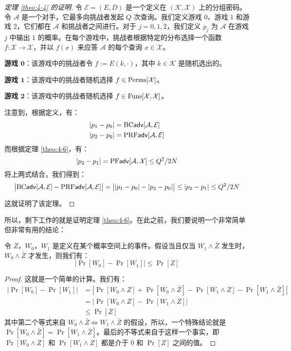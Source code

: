 \begin{proof}[定理 \ref{theo:4-4} 的证明]
令 $\mathcal{E}=(E,D)$ 是一个定义在 $(\mathcal{K},\mathcal{X})$ 上的分组密码。令 $\mathcal{A}$ 是一个对手，它最多向挑战者发起 $Q$ 次查询。我们定义游戏 $0$、游戏 $1$ 和游戏 $2$，它们都在 $\mathcal{A}$ 和挑战者之间进行。对于 $j=0,1,2$，我们定义 $p_j$ 为 $\mathcal{A}$ 在游戏 $j$ 中输出 $1$ 的概率。在每个游戏中，挑战者根据特定的分布选择一个函数 $f:\mathcal{X}\to\mathcal{X}$，并以 $f(x)$ 来应答 $\mathcal{A}$ 的每个查询 $x\in\mathcal{X}$。

\noindent\textbf{游戏 $\mathbf{0}$}：该游戏中的挑战者令 $f:=E(k,\cdot)$，其中 $k\in\mathcal{K}$ 是随机选出的。

\noindent\textbf{游戏 $\mathbf{1}$}：该游戏中的挑战者随机选择 $f\in{\rm Perms}[\mathcal{X}]$。

\noindent\textbf{游戏 $\mathbf{2}$}：该游戏中的挑战者随机选择 $f\in{\rm Funs}[\mathcal{X},\mathcal{X}]$。

注意到，根据定义，有：
\[
\begin{aligned}
	& |p_1-p_0| = {\rm BC\mathsf{adv}}[\mathcal{A},\mathcal{E}]\\
	& |p_2-p_0| = {\rm PRF\mathsf{adv}}[\mathcal{A},\mathcal{E}]
\end{aligned}
\]
而根据定理 \ref{theo:4-6}，有：
\[
|p_2-p_1|={\rm PF\mathsf{adv}}[\mathcal{A},\mathcal{X}]\leq{Q^2}/{2N}
\]
将上两式结合，我们得到：
\[
\big\lvert
{\rm BC\mathsf{adv}}[\mathcal{A},\mathcal{E}]-{\rm PRF\mathsf{adv}}[\mathcal{A},\mathcal{E}]
\big\rvert
=
\big\lvert
|p_1-p_0|-|p_2-p_0|
\big\rvert
\leq|p_2-p_1|\leq{Q^2}/{2N}
\]

这就证明了该定理。
\end{proof}

所以，剩下工作的就是证明定理 \ref{theo:4-6}。在此之前，我们要说明一个非常简单但非常有用的结论：

\begin{theorem}[差分引理]\label{theo:4-7}
令 $Z$，$W_0$，$W_1$ 是定义在某个概率空间上的事件。假设当且仅当 $W_1\land\bar Z$ 发生时，$W_0\land\bar Z$ 才发生，则我们有：
\[
|\Pr[W_0]-\Pr[W_1]|\leq\Pr[Z]
\]
\end{theorem}

\begin{proof}
这就是一个简单的计算。我们有：
\[
\begin{aligned}
|\Pr[W_0]-\Pr[W_1]|
&=|\Pr[W_0\land Z]+\Pr[W_0\land\bar Z]-\Pr[W_1\land Z]-\Pr[W_1\land\bar Z]|\\
&=|\Pr[W_0\land Z]-\Pr[W_1\land Z]|\\
&\leq \Pr[Z]
\end{aligned}
\]
其中第二个等式来自 $W_0\land\bar{Z} \Longleftrightarrow W_1\land\bar{Z}$ 的假设，所以，一个特殊结论就是 $\Pr[W_0\land\bar{Z}]=\Pr[W_1\land\bar{Z}]$。最后的不等式来自于这样一个事实，即 $\Pr[W_0\land Z]$ 和 $\Pr[W_1\land Z]$ 都是介于 $0$ 和 $\Pr[Z]$ 之间的值。
\end{proof}
 

